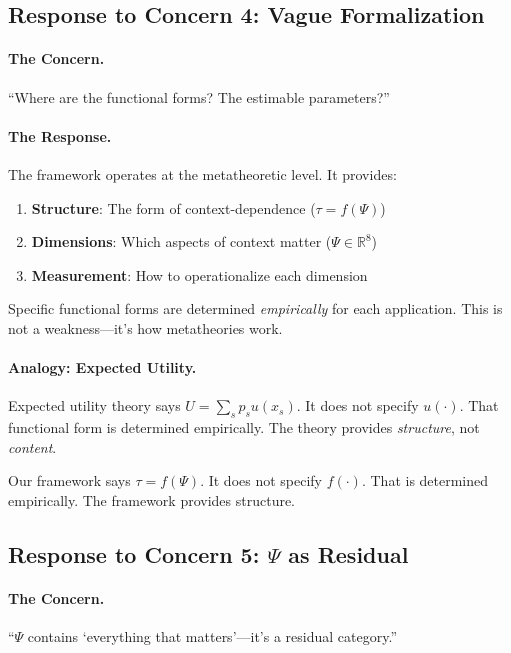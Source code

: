 \documentclass[12pt,a4paper]{article}
\begin{document}
\subsection{Response to Concern 4: Vague Formalization}

\paragraph{The Concern.}
``Where are the functional forms? The estimable parameters?''

\paragraph{The Response.}
The framework operates at the metatheoretic level. It provides:
\begin{enumerate}
    \item \textbf{Structure}: The form of context-dependence ($\tau = f(\Psi)$)
    \item \textbf{Dimensions}: Which aspects of context matter ($\Psi \in \mathbb{R}^8$)
    \item \textbf{Measurement}: How to operationalize each dimension
\end{enumerate}

Specific functional forms are determined \textit{empirically} for each application. This is not a weakness---it's how metatheories work.

\paragraph{Analogy: Expected Utility.}
Expected utility theory says $U = \sum_s p_s u(x_s)$. It does not specify $u(\cdot)$. That functional form is determined empirically. The theory provides \textit{structure}, not \textit{content}.

Our framework says $\tau = f(\Psi)$. It does not specify $f(\cdot)$. That is determined empirically. The framework provides structure.

\subsection{Response to Concern 5: $\Psi$ as Residual}

\paragraph{The Concern.}
``$\Psi$ contains `everything that matters'---it's a residual category.''
\end{document}
